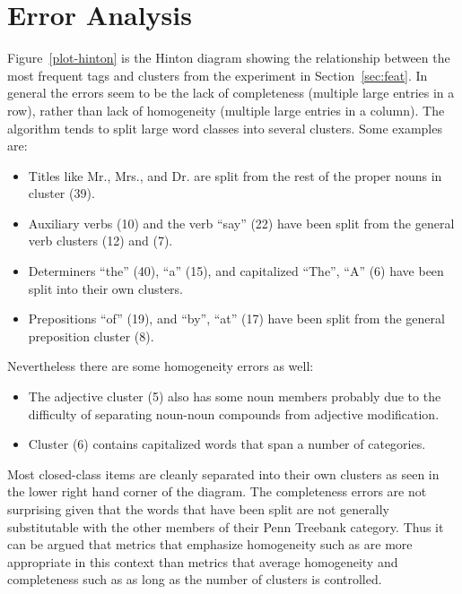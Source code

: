 \section{Error Analysis}
\label{sec:discuss}

Figure~\ref{plot-hinton} is the Hinton diagram showing the
relationship between the most frequent tags and clusters from the
experiment in Section~\ref{sec:feat}.  In general the errors seem to
be the lack of completeness (multiple large entries in a row), rather
than lack of homogeneity (multiple large entries in a column).  The
algorithm tends to split large word classes into several clusters.
Some examples are:
\begin{itemize}
\item Titles like Mr., Mrs., and Dr. are split from the rest of the
  proper nouns in cluster (39).
\item Auxiliary verbs (10) and the verb ``say'' (22) have been split
  from the general verb clusters (12) and (7).
\item Determiners ``the'' (40), ``a'' (15), and capitalized
  ``The'', ``A'' (6) have been split into their own clusters.
\item Prepositions ``of'' (19), and ``by'', ``at'' (17) have been
  split from the general preposition cluster (8).
\end{itemize}
Nevertheless there are some homogeneity errors as well:
\begin{itemize} 
\item The adjective cluster (5) also has some noun members probably
  due to the difficulty of separating noun-noun compounds from
  adjective modification.
\item Cluster (6) contains capitalized words that span a number of
  categories.
\end{itemize}

Most closed-class items are cleanly separated into their own clusters
as seen in the lower right hand corner of the diagram.  The
completeness errors are not surprising given that the words that have
been split are not generally substitutable with the other members of
their Penn Treebank category.  Thus it can be argued that metrics that
emphasize homogeneity such as \mto are more appropriate in this
context than metrics that average homogeneity and completeness such as
\vm as long as the number of clusters is controlled.

